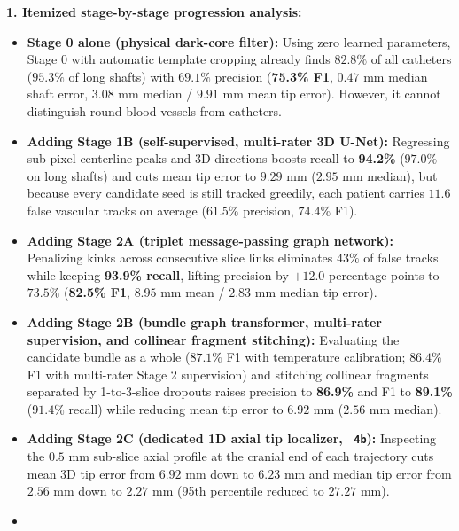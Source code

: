 \documentclass[
  11pt,
]{article}
\providecommand{\tightlist}{%
  \setlength{\itemsep}{0pt}\setlength{\parskip}{0pt}}
\let\nforigtexttt\texttt
\renewcommand{\texttt}[1]{\nforigtexttt{\XeTeXinterchartokenstate=1 #1}}
\begin{document}


\textbf{1. Itemized stage-by-stage progression analysis:}

\begin{itemize}
\tightlist
\item
  \textbf{Stage 0 alone (physical dark-core filter):} Using zero learned
  parameters, Stage 0 with automatic template cropping already finds
  \(82.8\%\) of all catheters (\(95.3\%\) of long shafts) with
  \(69.1\%\) precision (\textbf{75.3\% F1}, \(0.47\text{ mm}\) median
  shaft error, \(3.08\text{ mm}\) median / \(9.91\text{ mm}\) mean tip
  error). However, it cannot distinguish round blood vessels from
  catheters.
\item
  \textbf{Adding Stage 1B (self-supervised, multi-rater 3D U-Net):}
  Regressing sub-pixel centerline peaks and 3D directions boosts recall
  to \textbf{94.2\%} (\(97.0\%\) on long shafts) and cuts mean tip error
  to \(9.29\text{ mm}\) (\(2.95\text{ mm}\) median), but because every
  candidate seed is still tracked greedily, each patient carries
  \(11.6\) false vascular tracks on average (\(61.5\%\) precision,
  \(74.4\%\) F1).
\item
  \textbf{Adding Stage 2A (triplet message-passing graph network):}
  Penalizing kinks across consecutive slice links eliminates \(43\%\) of
  false tracks while keeping \textbf{93.9\% recall}, lifting precision
  by \(+12.0\) percentage points to \(73.5\%\) (\textbf{82.5\% F1},
  \(8.95\text{ mm}\) mean / \(2.83\text{ mm}\) median tip error).
\item
  \textbf{Adding Stage 2B (bundle graph transformer, multi-rater
  supervision, and collinear fragment stitching):} Evaluating the
  candidate bundle as a whole (\(87.1\%\) F1 with temperature
  calibration; \(86.4\%\) F1 with multi-rater Stage 2 supervision) and
  stitching collinear fragments separated by 1-to-3-slice dropouts
  raises precision to \textbf{86.9\%} and F1 to \textbf{89.1\%}
  (\(91.4\%\) recall) while reducing mean tip error to
  \(6.92\text{ mm}\) (\(2.56\text{ mm}\) median).
\item
  \textbf{Adding Stage 2C (dedicated 1D axial tip localizer,
  \texttt{4b}):} Inspecting the \(0.5\text{ mm}\) sub-slice axial
  profile at the cranial end of each trajectory cuts mean 3D tip error
  from \(6.92\text{ mm}\) down to \textbf{\(6.23\text{ mm}\)} and median
  tip error from \(2.56\text{ mm}\) down to \textbf{\(2.27\text{ mm}\)}
  (95th percentile reduced to \(27.27\text{ mm}\)).
\item

\end{itemize}
\end{document}
